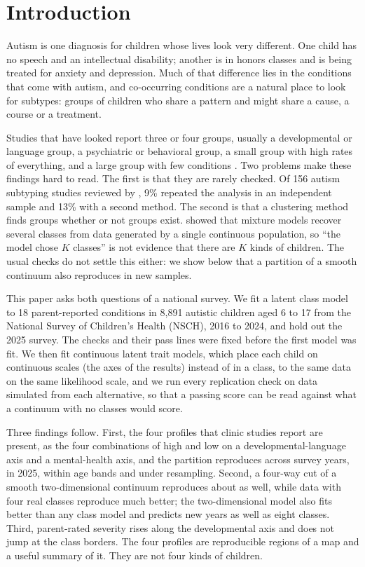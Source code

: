 \section{Introduction}
\label{sec:intro}

Autism is one diagnosis for children whose lives look very different. One child has no speech and an intellectual disability; another is in honors classes and is being treated for anxiety and depression. Much of that difference lies in the conditions that come with autism, and co-occurring conditions are a natural place to look for subtypes: groups of children who share a pattern and might share a cause, a course or a treatment.

Studies that have looked report three or four groups, usually a developmental or language group, a psychiatric or behavioral group, a small group with high rates of everything, and a large group with few conditions \citep{doshivelez2014,vargason2019,montgomery2023,litman2025}. Two problems make these findings hard to read. The first is that they are rarely checked. Of 156 autism subtyping studies reviewed by \citet{agelink2021}, 9\% repeated the analysis in an independent sample and 13\% with a second method. The second is that a clustering method finds groups whether or not groups exist. \citet{bauer2003,bauer2004} showed that mixture models recover several classes from data generated by a single continuous population, so ``the model chose $K$ classes'' is not evidence that there are $K$ kinds of children. The usual checks do not settle this either: we show below that a partition of a smooth continuum also reproduces in new samples.

This paper asks both questions of a national survey. We fit a latent class model to 18 parent-reported conditions in 8,891 autistic children aged 6 to 17 from the National Survey of Children's Health (NSCH), 2016 to 2024, and hold out the 2025 survey. The checks and their pass lines were fixed before the first model was fit. We then fit continuous latent trait models, which place each child on continuous scales (the axes of the results) instead of in a class, to the same data on the same likelihood scale, and we run every replication check on data simulated from each alternative, so that a passing score can be read against what a continuum with no classes would score.

Three findings follow. First, the four profiles that clinic studies report are present, as the four combinations of high and low on a developmental-language axis and a mental-health axis, and the partition reproduces across survey years, in 2025, within age bands and under resampling. Second, a four-way cut of a smooth two-dimensional continuum reproduces about as well, while data with four real classes reproduce much better; the two-dimensional model also fits better than any class model and predicts new years as well as eight classes. Third, parent-rated severity rises along the developmental axis and does not jump at the class borders. The four profiles are reproducible regions of a map and a useful summary of it. They are not four kinds of children.

